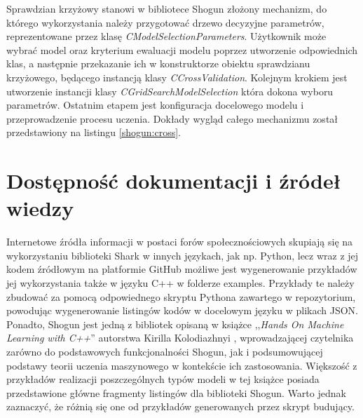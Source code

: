 Sprawdzian krzyżowy stanowi w bibliotece Shogun złożony mechanizm, do którego wykorzystania należy przygotować drzewo decyzyjne parametrów, reprezentowane przez klasę \textit{CModelSelectionParameters}. Użytkownik może wybrać model oraz kryterium ewaluacji modelu poprzez utworzenie odpowiednich klas, a następnie przekazanie ich w konstruktorze obiektu sprawdzianu krzyżowego, będącego instancją klasy \textit{CCrossValidation}. Kolejnym krokiem jest utworzenie instancji klasy \textit{CGridSearchModelSelection} która dokona wyboru parametrów. Ostatnim etapem jest konfiguracja docelowego modelu i przeprowadzenie procesu uczenia. Dokłady wygląd całego mechanizmu został przedstawiony na listingu \ref{shogun:cross}.


\section{Dostępność dokumentacji i źródeł wiedzy}

Internetowe źródła informacji w postaci forów społecznościowych skupiają się na wykorzystaniu biblioteki Shark w innych językach, jak np. Python, lecz wraz z jej kodem źródłowym na platformie GitHub \cite{shogun:github} możliwe jest wygenerowanie przykładów jej wykorzystania także w języku C++ w folderze examples. Przykłady te należy zbudować za pomocą odpowiednego skryptu Pythona zawartego w repozytorium, powodując wygenerowanie listingów kodów w docelowym języku w plikach JSON. Ponadto, Shogun jest jedną z bibliotek opisaną w książce ,,\textit{Hands On Machine Learning with C++}'' autorstwa Kirilla Kolodiazhnyi \cite{handsOnMachineLearning}, wprowadzającej czytelnika zarówno do podstawowych funkcjonalności Shogun, jak i podsumowującej podstawy teorii uczenia maszynowego w kontekście ich zastosowania. Większość z przykładów realizacji poszczególnych typów modeli w tej książce posiada przedstawione główne fragmenty listingów dla biblioteki Shogun. Warto jednak zaznaczyć, że różnią się one od przykładów generowanych przez skrypt budujący.